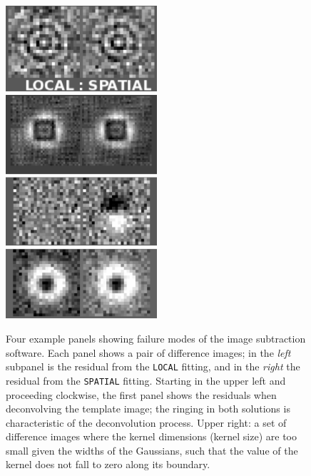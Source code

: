 \documentclass[floatfix, apj]{emulateapj}
\begin{document}
\begin{figure}[!ht]
  \includegraphics[width=0.5\textwidth, height=0.25\textwidth]{fig1a_crop.eps}
  \includegraphics[width=0.5\textwidth, height=0.25\textwidth]{fig1b_crop.eps} \\
  \includegraphics[width=0.5\textwidth, height=0.25\textwidth]{fig1c_crop.eps}
  \includegraphics[width=0.5\textwidth, height=0.25\textwidth]{fig1d_crop.eps} \\
\caption{Four example panels showing failure modes of the image subtraction software.
  Each panel shows a pair of difference images; 
  in the {\it left} subpanel is the residual from the {\tt LOCAL} fitting, and in the {\it right} the residual from the {\tt SPATIAL} fitting.
  Starting in the upper left and proceeding clockwise, the first panel shows the residuals when deconvolving the template image; 
  the ringing in both solutions is characteristic of the deconvolution process.
  Upper right: a set of difference images where the kernel dimensions (kernel size) are too small given the widths of the Gaussians, such that the value of the kernel does not fall to zero along its boundary.
}
\end{figure}
\end{document}
